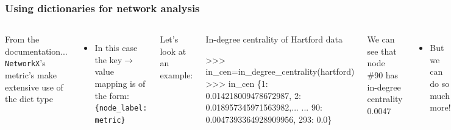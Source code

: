\documentclass[xcolor=dvipsnames, 9pt]{beamer}
\newenvironment{code}{\begin{semiverbatim} \begin{footnotesize}}
{\end{footnotesize}\end{semiverbatim}}
\begin{document}
\begin{frame}[fragile]
    \frametitle{Using dictionaries for network analysis}
    \begin{columns}
        From the documentation...\\ \vspace{3mm}
        \texttt{NetworkX}'s metric's make extensive use of the dict type
        \begin{itemize}
            \item In this case the key$\rightarrow$value mapping is of the form: \texttt{\{node\_label: metric\}} 
        \end{itemize}
        Let's look at an example:
        \begin{block}{In-degree centrality of Hartford data}
            \begin{code}
\scriptsize{>>> in_cen=in_degree_centrality(hartford)
>>> in_cen
\{1: 0.014218009478672987, 2: 0.018957345971563982,...
...
90: 0.0047393364928909956, 293: 0.0\}}
            \end{code}
        \end{block}
        We can see that node \#90 has in-degree centrality 0.0047
        \begin{itemize}
            \item But we can do so much more!
        \end{itemize}
    \end{columns}
\end{frame}
\end{document}
